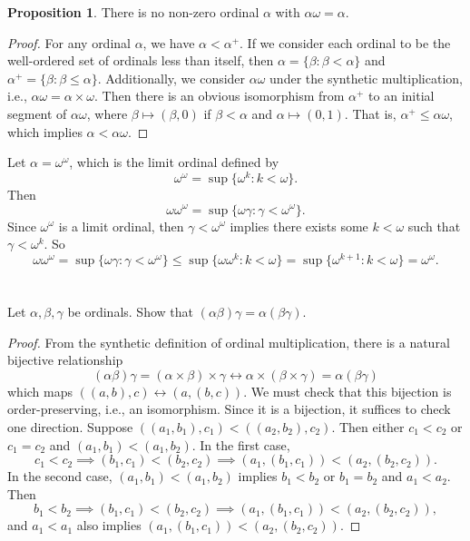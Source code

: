 \documentclass[12pt]{article}
\newenvironment{pbox}
    {\begin{lrbox}{\mybox}\begin{minipage}{0.98\textwidth}}
    {\end{minipage}\end{lrbox}\begin{center}\framebox[\textwidth]{\usebox{\mybox}}\end{center}}
\theoremstyle{definition}
\newtheorem{proposition}{Proposition}
\begin{document}
\begin{proposition}
    There is no non-zero ordinal $\alpha$ with $\alpha\omega = \alpha$.
\end{proposition}

\begin{proof}
    For any ordinal $\alpha$, we have $\alpha < \alpha^+$. If we consider each ordinal to be the well-ordered set of ordinals less than itself, then $\alpha = \{\beta : \beta < \alpha\}$ and $\alpha^+ = \{\beta : \beta \leq \alpha\}$. Additionally, we consider $\alpha\omega$ under the synthetic multiplication, i.e., $\alpha\omega = \alpha \times \omega$. Then there is an obvious isomorphism from $\alpha^+$ to an initial segment of $\alpha\omega$, where $\beta \mapsto (\beta, 0)$ if $\beta < \alpha$ and $\alpha \mapsto (0, 1)$. That is, $\alpha^+ \leq \alpha\omega$, which implies $\alpha < \alpha\omega$.
\end{proof}

Let $\alpha = \omega^\omega$, which is the limit ordinal defined by
\[
    \omega^\omega = \sup\{\omega^k : k < \omega\}.
\]
Then
\[
    \omega\omega^\omega = \sup\{\omega\gamma : \gamma < \omega^\omega\}.
\]
Since $\omega^\omega$ is a limit ordinal, then $\gamma < \omega^\omega$ implies there exists some $k < \omega$ such that $\gamma < \omega^k$. So
\[
    \omega\omega^\omega 
        =\sup\{\omega\gamma : \gamma < \omega^\omega\}
        \leq \sup\{\omega\omega^k : k < \omega\}
        = \sup\{\omega^{k+1} : k < \omega\}
        = \omega^\omega.
\]

\section{}
\begin{pbox}
    Let $\alpha, \beta, \gamma$ be ordinals. Show that $(\alpha\beta)\gamma = \alpha(\beta\gamma)$.
\end{pbox}

\begin{proof}
    From the synthetic definition of ordinal multiplication, there is a natural bijective relationship
    \[
        (\alpha\beta)\gamma 
        = (\alpha \times \beta) \times \gamma 
        \leftrightarrow \alpha \times (\beta \times \gamma)
        = \alpha(\beta\gamma)
    \]
    which maps $((a, b), c) \leftrightarrow (a, (b, c))$. We must check that this bijection is order-preserving, i.e., an isomorphism. Since it is a bijection, it suffices to check one direction. Suppose $((a_1, b_1), c_1) < ((a_2, b_2), c_2)$. Then either $c_1 < c_2$ or $c_1 = c_2$ and $(a_1, b_1) < (a_1, b_2)$. In the first case,
    \[
        c_1 < c_2 \implies (b_1, c_1) < (b_2, c_2) \implies (a_1, (b_1, c_1)) < (a_2, (b_2, c_2)).
    \]
    In the second case, $(a_1, b_1) < (a_1, b_2)$ implies $b_1 < b_2$ or $b_1 = b_2$ and $a_1 < a_2$. Then
    \[
        b_1 < b_2 \implies (b_1, c_1) < (b_2, c_2) \implies (a_1, (b_1, c_1)) < (a_2, (b_2, c_2)),
    \]
    and $a_1 < a_1$ also implies $(a_1, (b_1, c_1)) < (a_2, (b_2, c_2))$.
    
\end{proof}
\end{document}

